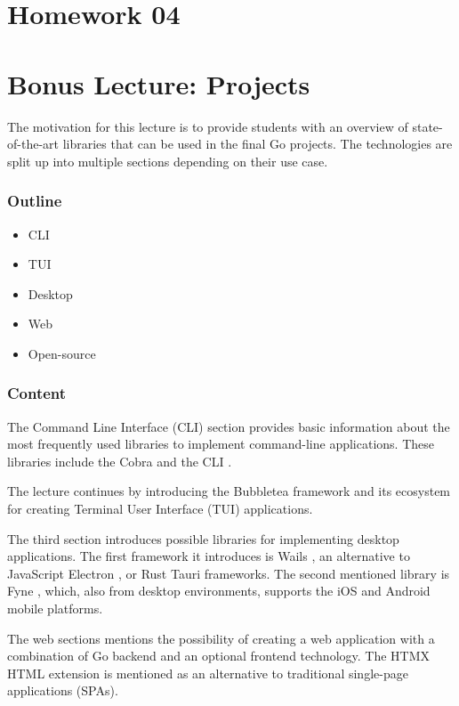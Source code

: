 \documentclass[
  digital,
  color,
  oneside,
  nosansbold,
  nocolorbold,
  lof,
  lot,
]{fithesis4}
\begin{document}
\section{Homework 04}

\section{Bonus Lecture: Projects} \label{lecture-projects}

The motivation for this lecture is to provide students with an overview of state-of-the-art libraries that can be used in the final Go projects. The technologies are split up into multiple sections depending on their use case.

\subsubsection{Outline}

\begin{itemize}
    \item CLI
    \item TUI
    \item Desktop
    \item Web
    \item Open-source
\end{itemize}

\subsubsection{Content}

The Command Line Interface (CLI) section provides basic information about the most frequently used libraries to implement command-line applications. These libraries include the Cobra \cite{spf13-cobra} and the CLI \cite{urfave-cli}.

The lecture continues by introducing the Bubbletea \cite{charmbracelet-bubbletea} framework and its ecosystem for creating Terminal User Interface (TUI) applications.

The third section introduces possible libraries for implementing desktop applications. The first framework it introduces is Wails \cite{wailsapp-wails}, an alternative to JavaScript Electron \cite{electron-electron}, or Rust Tauri \cite{tauri-apps-tauri} frameworks. The second mentioned library is Fyne \cite{fyne-io-fyne}, which, also from desktop environments, supports the iOS and Android mobile platforms.

The web sections mentions the possibility of creating a web application with a combination of Go backend and an optional frontend technology. The HTMX HTML extension \cite{bigskysoftware-htmx} is mentioned as an alternative to traditional single-page applications (SPAs).
\end{document}
